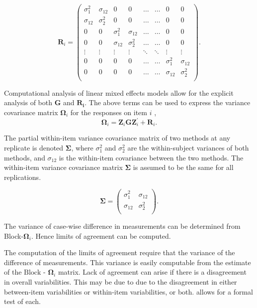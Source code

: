 \documentclass[12pt, a4paper]{report}
\theoremstyle{plain}
\theoremstyle{definition}
\theoremstyle{remark}
\begin{document}
	\[ \boldsymbol{R}_i =\left(
	\begin{array}{cccccccc}
	\sigma^2_1  & \sigma_{12} & 0 & 0 & \ldots & \ldots & 0 & 0 \\
	\sigma_{12} & \sigma^2_2  & 0 & 0  & \ldots & \ldots & 0 & 0\\
	
	0 & 0 &\sigma^2_1  & \sigma_{12} & \ldots & \ldots& 0 &  0 \\
	0 & 0 &\sigma_{12} & \sigma^2_2  & \ldots & \ldots & 0 & 0 \\
	\vdots & \vdots &\vdots & \vdots & \ddots & \ddots& \vdots & \vdots \\
	
	0 & 0 &0 & 0 & \ldots & \ldots&\sigma^2_1  & \sigma_{12} \\
	0 & 0 &0 & 0 & \ldots & \ldots &\sigma_{12} & \sigma^2_2 \\
	\end{array}
	\right). \]
	


	
 Computational analysis of linear mixed effects models allow for the explicit analysis of both $\boldsymbol{G}$ and $\boldsymbol{R_i}$.
	The above terms can be used to express the  variance covariance matrix $\boldsymbol{\Omega}_i$ for the responses on item $i$ ,
	\[
	\boldsymbol{\Omega}_i = \boldsymbol{Z}_i \boldsymbol{G} \boldsymbol{Z}_i^{\prime} + \boldsymbol{R}_i.
	\]

\bigskip

The partial within-item variance covariance matrix of two methods at any replicate is denoted $\boldsymbol{\Sigma}$, where $\sigma^2_{1}$ and $\sigma^2_{2}$ are the within-subject variances of both methods, and $\sigma_{12}$ is the within-item covariance between the two methods. The within-item variance covariance matrix $\boldsymbol{\Sigma}$ is assumed to be the same for all replications.

\[
\boldsymbol{\Sigma} = \left( \begin{array}{cc}
\sigma^2_{1} & \sigma_{12} \\
\sigma_{12} & \sigma^2_{2} \\
\end{array}\right).
\]	


	The variance of case-wise difference in measurements can be determined from Block-$\boldsymbol{\Omega}_{i}$. Hence limits of agreement can be computed.
	
	
	The computation of the limits of agreement require that the variance of the difference of measurements. This variance is easily computable from the estimate of the ${\mbox{Block - }\boldsymbol \Omega_{i}}$ matrix. Lack of agreement can arise if there is a disagreement in overall variabilities. This may be due to due to the disagreement in either between-item
	variabilities or within-item variabilities, or both. \citet{ARoy2009} allows for a formal test of each.
	\newpage
\end{document}
